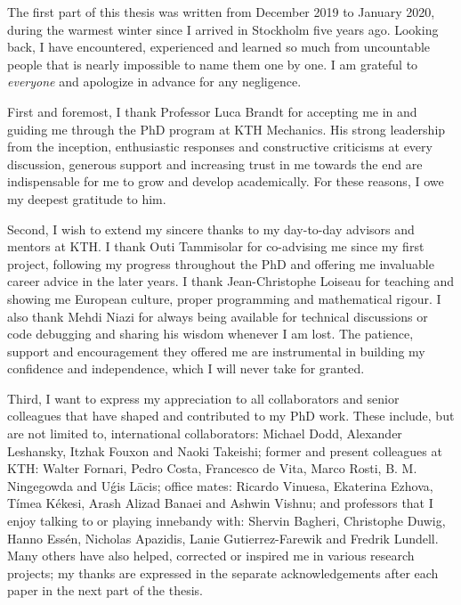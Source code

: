 \begin{acknowledgements}

  The first part of this thesis was written from December 2019 to January 2020, during the warmest winter since I arrived in Stockholm five years ago.
  Looking back, I have encountered, experienced and learned so much from uncountable people that is nearly impossible to name them one by one.
  I am grateful to \emph{everyone} and apologize in advance for any negligence.

  First and foremost, I thank Professor Luca Brandt for accepting me in and guiding me through the PhD program at KTH Mechanics.
  His strong leadership from the inception,
  enthusiastic responses and constructive criticisms at every discussion,
  generous support and increasing trust in me towards the end are indispensable for me to grow and develop academically.
  For these reasons, I owe my deepest gratitude to him.

  Second, I wish to extend my sincere thanks to my day-to-day advisors and mentors at KTH.
  I thank Outi Tammisolar for co-advising me since my first project, following my progress throughout the PhD
  and offering me invaluable career advice in the later years.
  I thank Jean-Christophe Loiseau for teaching and showing me European culture, proper programming and mathematical rigour.
  I also thank Mehdi Niazi for always being available for technical discussions or code debugging and sharing his wisdom whenever I am lost.
  The patience, support and encouragement they offered me are instrumental in building my confidence and independence, which I will never take for granted.

  Third, I want to express my appreciation to all collaborators and senior colleagues that have shaped and contributed to my PhD work.
  These include, but are not limited to, international collaborators: Michael Dodd, Alexander Leshansky, Itzhak Fouxon and Naoki Takeishi;
  former and present colleagues at KTH: Walter Fornari, Pedro Costa, Francesco de Vita, Marco Rosti, B. M. Ningegowda and U\'{g}is L\={a}cis;
  office mates: Ricardo Vinuesa, Ekaterina Ezhova, Tímea Kékesi, Arash Alizad Banaei and Ashwin Vishnu;
  and professors that I enjoy talking to or playing innebandy with:
  Shervin Bagheri, Christophe Duwig, Hanno Essén, Nicholas Apazidis, Lanie Gutierrez-Farewik and Fredrik Lundell.
  Many others have also helped, corrected or inspired me in various research projects;
  my thanks are expressed in the separate acknowledgements after each paper in the next part of the thesis.
  

\end{acknowledgements}
